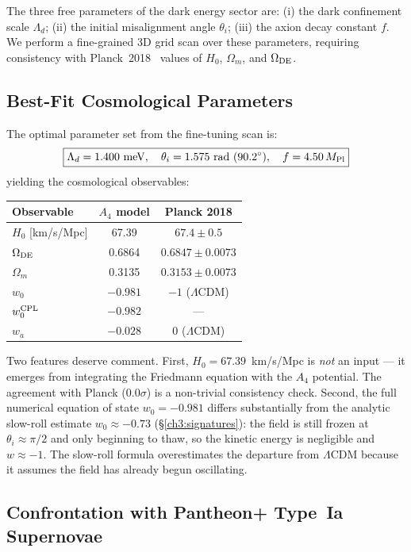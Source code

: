 The three free parameters of the dark energy sector are:
(i) the dark confinement scale $\Lambda_d$;
(ii) the initial misalignment angle $\theta_i$;
(iii) the axion decay constant $f$.
We perform a fine-grained 3D grid scan over these parameters, requiring
consistency with Planck~2018~\cite{Planck2018} values of $H_0$, $\Omega_m$,
and $\Omega_{\rm DE}$.

\subsection{Best-Fit Cosmological Parameters}
\label{ch3:bestfit}

The optimal parameter set from the fine-tuning scan is:
\begin{equation}
\boxed{
  \Lambda_d = 1.400~{\rm meV}, \quad
  \theta_i = 1.575~{\rm rad}~(90.2^\circ), \quad
  f = 4.50\,M_{\rm Pl}
}
\end{equation}
yielding the cosmological observables:
\begin{center}
\begin{tabular}{lcc}
\toprule
Observable & $A_4$ model & Planck 2018 \\
\midrule
$H_0$ [km/s/Mpc] & 67.39 & $67.4 \pm 0.5$ \\
$\Omega_{\rm DE}$ & 0.6864 & $0.6847 \pm 0.0073$ \\
$\Omega_m$ & 0.3135 & $0.3153 \pm 0.0073$ \\
$w_0$ & $-0.981$ & $-1$ ($\Lambda$CDM) \\
$w_0^{\rm CPL}$ & $-0.982$ & --- \\
$w_a$ & $-0.028$ & 0 ($\Lambda$CDM) \\
\bottomrule
\end{tabular}
\end{center}

Two features deserve comment.
First, $H_0 = 67.39$~km/s/Mpc is \emph{not} an input --- it emerges from
integrating the Friedmann equation with the $A_4$ potential. The agreement
with Planck ($0.0\sigma$) is a non-trivial consistency check.
Second, the full numerical equation of state $w_0 = -0.981$ differs
substantially from the analytic slow-roll estimate $w_0 \approx -0.73$
(§\ref{ch3:signatures}): the field is still frozen at $\theta_i \approx \pi/2$
and only beginning to thaw, so the kinetic energy is negligible and
$w \approx -1$. The slow-roll formula overestimates the departure from
$\Lambda$CDM because it assumes the field has already begun oscillating.

\subsection{Confrontation with Pantheon+ Type~Ia Supernovae}
\label{ch3:pantheon}

